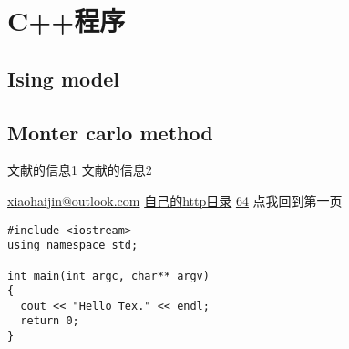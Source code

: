 \documentclass[11pt,UTF8,hyperref,openany]{ctexbook}
\begin{document}
\appendix
\chapter{C++程序}
\section{Ising model}
\section{Monter carlo method}

\begin{thebibliography}{99}
文献的信息1
文献的信息2
\end{thebibliography}

\noindent\url{xiaohaijin@outlook.com}\newline
\href{http://192.168.1.119/self/index.html}{自己的http目录}\newline
\href{http://10.10.11.64}{64}\newline
点我回到第一页

\begin{linenumbers}[2]%
\newline
\end{linenumbers}

\begin{lstlisting}
#include <iostream>
using namespace std;

int main(int argc, char** argv)
{
  cout << "Hello Tex." << endl;
  return 0;
}
\end{lstlisting}
\end{document}
